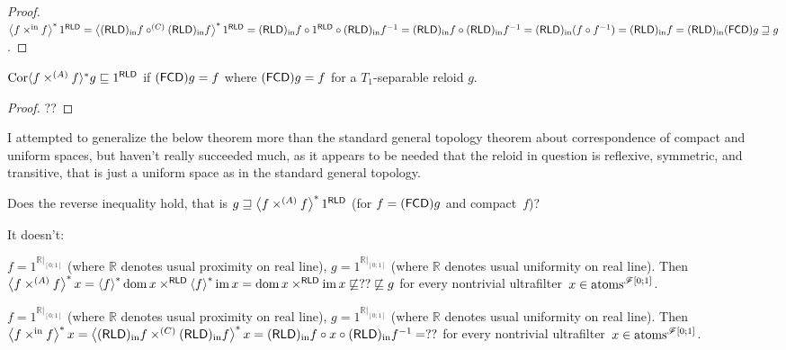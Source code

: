 \begin{proof}
$\left\langle f \times^{\mathrm{in}} f\right\rangle ^{\ast} 1^{\mathsf{RLD}} =
\left\langle (\mathsf{RLD})_{\mathrm{in}} f\circ^{(C)}(\mathsf{RLD})_{\mathrm{in}} f\right\rangle ^{\ast} 1^{\mathsf{RLD}} =
(\mathsf{RLD})_{\mathrm{in}} f\circ 1^{\mathsf{RLD}} \circ (\mathsf{RLD})_{\mathrm{in}} f^{-1} = 
(\mathsf{RLD})_{\mathrm{in}} f\circ (\mathsf{RLD})_{\mathrm{in}} f^{-1} = 
(\mathsf{RLD})_{\mathrm{in}} (f\circ f^{-1}) = (\mathsf{RLD})_{\mathrm{in}} f = (\mathsf{RLD})_{\mathrm{in}}(\mathsf{FCD}) g \sqsupseteq g$.
\end{proof}

\begin{lem}
  $\operatorname{Cor} \langle f \times^{(A)} f \rangle^{\ast} g \sqsubseteq 1^{\mathsf{RLD}}$ if
  $(\mathsf{FCD}) g = f$ where $(\mathsf{FCD}) g = f$ for a
  $T_1$-separable reloid $g$.
\end{lem}

\begin{proof}
  ??
\end{proof}

\begin{rem}
  I attempted to generalize the below theorem more than the standard general
  topology theorem about correspondence of compact and uniform spaces, but
  haven't really succeeded much, as it appears to be needed that the reloid in
  question is reflexive, symmetric, and transitive, that is just a uniform
  space as in the standard general topology.
\end{rem}

Does the reverse inequality hold, that is $g \sqsupseteq \left\langle f \times^{(A)} f\right\rangle ^{\ast} 1^{\mathsf{RLD}}$
(for $f=(\mathsf{FCD}) g$ and compact~$f$)?

It doesn't:

\begin{example}
$f=1^{\mathbb{R}|_{[0;1]}}$ (where $\mathbb{R}$ denotes usual proximity on real line),
$g=1^{\mathbb{R}|_{[0;1]}}$ (where $\mathbb{R}$ denotes usual uniformity on real line).
Then $\left\langle f \times^{(A)} f\right\rangle ^{\ast} x = \left\langle f\right\rangle ^{\ast}\operatorname{dom} x\times^{\mathsf{RLD}}\left\langle f\right\rangle ^{\ast}\operatorname{im} x =
\operatorname{dom} x\times^{\mathsf{RLD}}\operatorname{im} x\not\sqsubseteq??\not\sqsubseteq g$
for every nontrivial ultrafilter~$x\in\operatorname{atoms}^{\mathscr{F}[0;1]}$.
\end{example}

\begin{example}
$f=1^{\mathbb{R}|_{[0;1]}}$ (where $\mathbb{R}$ denotes usual proximity on real line),
$g=1^{\mathbb{R}|_{[0;1]}}$ (where $\mathbb{R}$ denotes usual uniformity on real line).
Then $\left\langle f \times^{\mathrm{in}} f\right\rangle ^{\ast} x =
\left\langle (\mathsf{RLD})_{\mathrm{in}} f \times^{(C)} (\mathsf{RLD})_{\mathrm{in}} f\right\rangle ^{\ast} x =
(\mathsf{RLD})_{\mathrm{in}} f\circ x\circ(\mathsf{RLD})_{\mathrm{in}} f^{-1} =
??$
for every nontrivial ultrafilter~$x\in\operatorname{atoms}^{\mathscr{F}[0;1]}$.
\end{example}

